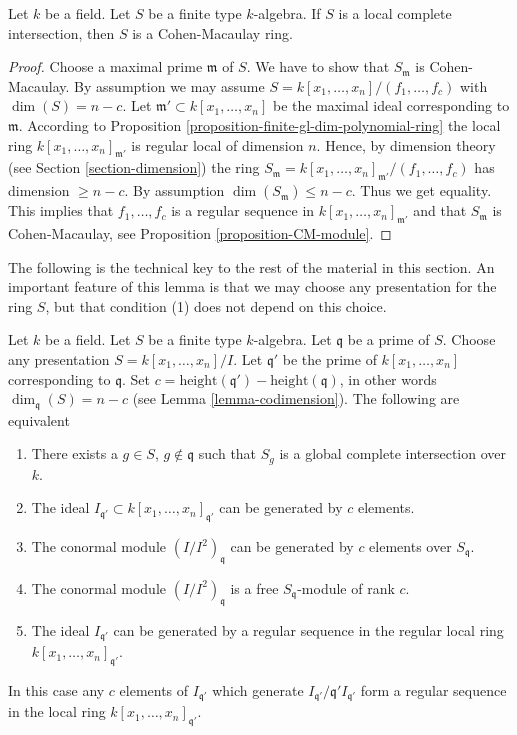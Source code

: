 \begin{lemma}
\label{lemma-lci-CM}
Let $k$ be a field. Let $S$ be a finite type $k$-algebra.
If $S$ is a local complete intersection, then
$S$ is a Cohen-Macaulay ring.
\end{lemma}

\begin{proof}
Choose a maximal prime $\mathfrak m$ of $S$.
We have to show that $S_\mathfrak m$ is Cohen-Macaulay.
By assumption we may assume $S = k[x_1, \ldots, x_n]/(f_1, \ldots, f_c)$
with $\dim(S) = n - c$. Let $\mathfrak m' \subset k[x_1, \ldots, x_n]$
be the maximal ideal corresponding to $\mathfrak m$.
According to Proposition \ref{proposition-finite-gl-dim-polynomial-ring}
the local ring
$k[x_1, \ldots, x_n]_{\mathfrak m'}$ is regular local of
dimension $n$. Hence, by dimension theory
(see Section \ref{section-dimension})
the ring
$S_{\mathfrak m} = k[x_1, \ldots, x_n]_{\mathfrak m'}/(f_1, \ldots, f_c)$
has dimension $\geq n - c$. By assumption $\dim(S_{\mathfrak m}) \leq n - c$.
Thus we get equality. This implies that $f_1, \ldots, f_c$ is a regular
sequence in $k[x_1, \ldots, x_n]_{\mathfrak m'}$ and that
$S_{\mathfrak m}$ is Cohen-Macaulay, see Proposition
\ref{proposition-CM-module}.
\end{proof}

\noindent
The following is the technical key to the rest of the material in this
section. An important feature of this lemma is that we may choose any
presentation for the ring $S$, but that condition (1) does not depend
on this choice.

\begin{lemma}
\label{lemma-lci}
Let $k$ be a field.
Let $S$ be a finite type $k$-algebra.
Let $\mathfrak q$ be a prime of $S$.
Choose any presentation $S = k[x_1, \ldots, x_n]/I$.
Let $\mathfrak q'$ be the prime of $k[x_1, \ldots, x_n]$ corresponding
to $\mathfrak q$. Set
$c = \text{height}(\mathfrak q') - \text{height}(\mathfrak q)$,
in other words $\dim_{\mathfrak q}(S) = n - c$
(see Lemma \ref{lemma-codimension}). The following are equivalent
\begin{enumerate}
\item There exists a $g \in S$, $g \not \in \mathfrak q$
such that $S_g$ is a global complete intersection over $k$.
\item The ideal $I_{\mathfrak q'} \subset k[x_1, \ldots, x_n]_{\mathfrak q'}$
can be generated by $c$ elements.
\item The conormal module $(I/I^2)_{\mathfrak q}$ can be generated by
$c$ elements over $S_{\mathfrak q}$.
\item The conormal module $(I/I^2)_{\mathfrak q}$ is a free
$S_{\mathfrak q}$-module of rank $c$.
\item The ideal $I_{\mathfrak q'}$ can be generated by a regular sequence
in the regular local ring $k[x_1, \ldots, x_n]_{\mathfrak q'}$.
\end{enumerate}
In this case any $c$ elements of $I_{\mathfrak q'}$
which generate $I_{\mathfrak q'}/\mathfrak q'I_{\mathfrak q'}$
form a regular sequence in the local
ring $k[x_1, \ldots, x_n]_{\mathfrak q'}$.
\end{lemma}

